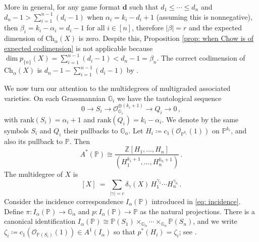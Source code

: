 \documentclass[12pt]{article}
\theoremstyle{definition}
\newenvironment{example}
{\pushQED{\qed}\renewcommand{\qedsymbol}{$\diamond$}\examplex}
{\popQED\endexamplex}
\newcommand{\G}{{\mathbb G}}
\newcommand{\Z}{{\mathbb Z}}
\newcommand{\PP}{{\mathbb P}}
\def\bd{{\boldsymbol{d}}}
\newcommand{\ko}{{\mathcal O}}
\begin{document}
\begin{example}
More in general, for any game format $\bd$ such that $d_1\le\cdots\le d_n$ and $d_n-1>\sum_{i=1}^{n-1}(d_i-1)$ when $\alpha_i=k_i-d_i+1$ (assuming this is nonnegative), then $\beta_i=k_i-\alpha_i=d_i-1$ for all $i\in[n]$, therefore $|\beta|=r$ and the expected dimension of $\mathrm{Ch}_\alpha(X)$ is zero. Despite this, Proposition \ref{prop: when Chow is of expected codimension} is not applicable because $\dim p_{\{n\}}(X)=\sum_{i=1}^{n-1}(d_i-1)<d_n-1=\beta_n$. The correct codimension of $\mathrm{Ch}_\alpha(X)$ is $d_n-1-\sum_{i=1}^{n-1}(d_i-1)$ by \cite[Theorem 3.31]{abo2026vector}.
\end{example}



We now turn our attention to the multidegrees of multigraded associated varieties. On each Grassmannian $\G_i$ we have the tautological sequence
\begin{equation}\label{eq: ith tautological sequence}
    0\to S_i \to \ko_{\G_i}^{\oplus (k_i+1)} \to Q_i \to 0\,,
\end{equation}
with $\mathrm{rank}(S_i)=\alpha_i+1$ and $\mathrm{rank}(Q_i)=k_i-\alpha_i$.
We denote by the same symbols $S_i$ and $Q_i$ their pullbacks to $\G_\alpha$.
Let $H_i\coloneqq c_1(\ko_{\PP^{k_i}}(1))$ on $\PP^{k_i}$, and also its pullback to $\PP$.
Then
\[
    A^*(\PP)\cong \frac{\Z[H_1,\dots,H_n]}{(H_1^{k_1+1},\dots,H_n^{k_n+1})}\,.
\]
The multidegree of $X$ is
\begin{equation}\label{eq: multidegree X}
    [X]\ =\ \sum_{|\gamma|=c} \delta_\gamma(X)\, H_1^{\gamma_1}\cdots H_n^{\gamma_n}\,.
\end{equation}
Consider the incidence correspondence $I_\alpha(\PP)$ introduced in \eqref{eq: incidence}. Define $\pi\colon I_\alpha(\PP)\to \G_\alpha$ and $p\colon I_\alpha(\PP)\to\PP$ as the natural projections.
There is a canonical identification $I_\alpha(\PP) \cong \PP(S_1)\times_{\G_\alpha} \cdots \times_{\G_\alpha}\PP(S_n)$, and we write $\zeta_i \coloneqq c_1(\ko_{\PP(S_i)}(1))\in A^1(I_\alpha)$ so that $p^*(H_i)=\zeta_i$; see \cite[Section 9.3.1]{EH}. 
\end{document}
